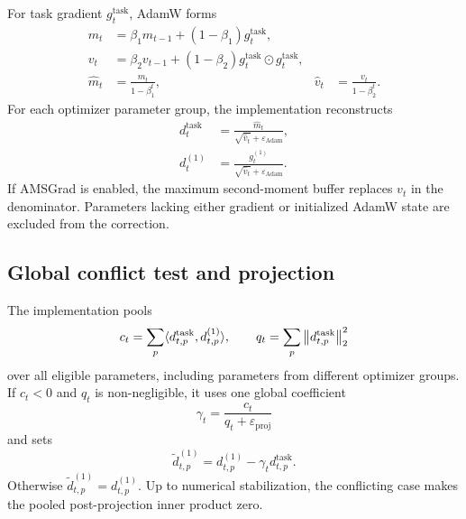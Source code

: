 For task gradient $g_t^{\mathrm{task}}$, AdamW forms
\begin{align}
    m_t
      &=\beta_1m_{t-1}+(1-\beta_1)g_t^{\mathrm{task}},
    \label{eq:adam-first-moment}\\
    v_t
      &=\beta_2v_{t-1}
        +(1-\beta_2)g_t^{\mathrm{task}}\odot g_t^{\mathrm{task}},
    \label{eq:adam-second-moment}\\
    \widehat m_t&=\frac{m_t}{1-\beta_1^t},
    &
    \widehat v_t&=\frac{v_t}{1-\beta_2^t}.
    \label{eq:adam-bias-correction}
\end{align}
For each optimizer parameter group, the implementation reconstructs
\begin{align}
    d_t^{\mathrm{task}}
      &=\frac{\widehat m_t}
              {\sqrt{\widehat v_t}+\varepsilon_{\mathrm{Adam}}},
    \label{eq:task-adaptive-direction}\\
    d_t^{(1)}
      &=\frac{g_t^{(1)}}
              {\sqrt{\widehat v_t}+\varepsilon_{\mathrm{Adam}}}.
    \label{eq:pressure-adaptive-direction}
\end{align}
If AMSGrad is enabled, the maximum second-moment buffer replaces $v_t$ in the
denominator. Parameters lacking either gradient or initialized AdamW state are
excluded from the correction.

\subsection{Global conflict test and projection}

The implementation pools
\begin{equation}
    c_t=\sum_p\langle d_{t,p}^{\mathrm{task}},d_{t,p}^{(1)}\rangle,
    \qquad
    q_t=\sum_p\left\lVert d_{t,p}^{\mathrm{task}}\right\rVert_2^2
    \label{eq:global-conflict-statistics}
\end{equation}
over all eligible parameters, including parameters from different optimizer
groups. If $c_t<0$ and $q_t$ is non-negligible, it uses one global coefficient
\begin{equation}
    \gamma_t=\frac{c_t}{q_t+\varepsilon_{\mathrm{proj}}}
    \label{eq:projection-coefficient}
\end{equation}
and sets
\begin{equation}
    \widetilde d_{t,p}^{(1)}
      =d_{t,p}^{(1)}-\gamma_t d_{t,p}^{\mathrm{task}}.
    \label{eq:global-projected-direction}
\end{equation}
Otherwise $\widetilde d_{t,p}^{(1)}=d_{t,p}^{(1)}$. Up to numerical
stabilization, the conflicting case makes the pooled post-projection inner
product zero.

